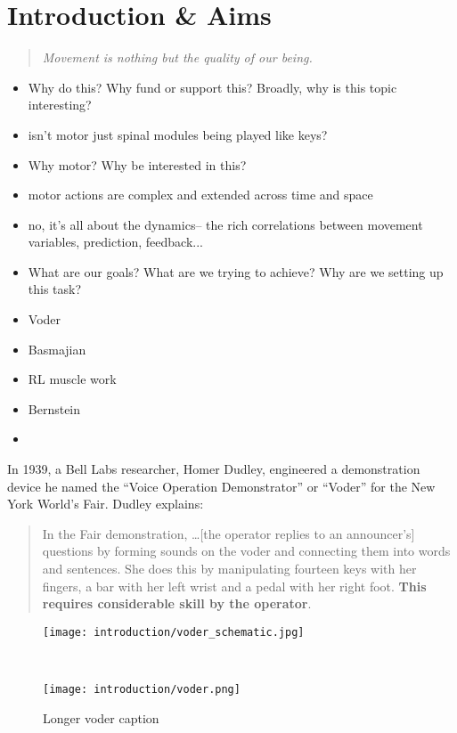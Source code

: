 \documentclass[../main.tex]{subfiles}
\begin{document}
\chapter{Introduction \& Aims}\label{chap:intro}

\bigskip
\begin{quote}
  \emph{Movement is nothing but the quality of our being.}
  
\end{quote}

\cleardoublepage%


\begin{itemize}
  \item Why do this? Why fund or support this? Broadly, why is this topic interesting?
  \item isn't motor just spinal modules being played like keys?
  \item Why motor? Why be interested in this?
  \item motor actions are complex and extended across time and space
  \item no, it's all about the dynamics-- the rich correlations between movement variables, prediction, feedback...
  \item What are our goals? What are we trying to achieve? Why are we setting up this task? 
  \item Voder
  \item Basmajian
  \item RL muscle work
  \item Bernstein
  \item 
\end{itemize}




In 1939, a Bell Labs researcher, Homer Dudley, engineered a demonstration device he named the ``Voice Operation Demonstrator'' or ``Voder'' for the New York World's Fair\cite{Dudley}. Dudley explains:

\begin{quote}
  In the Fair demonstration, \ldots [the operator replies to an announcer's] questions by forming sounds on the voder and connecting them into words and sentences. She does this by manipulating fourteen keys with her fingers, a bar with her left wrist and a pedal with her right foot. \textbf{This requires considerable skill by the operator}.
\end{quote}


\begin{figure}
  \centering
  \begin{minipage}{0.8\textwidth}
    \texttt{[image: introduction/voder\_schematic.jpg]}
    \subcaption{}
  \end{minipage}\\%
  \begin{minipage}{0.5\textwidth}
    \texttt{[image: introduction/voder.png]}
    \subcaption{}
  \end{minipage}
  \caption[Voder]{Longer voder caption}\label{fig:voder}
\end{figure}
\end{document}
